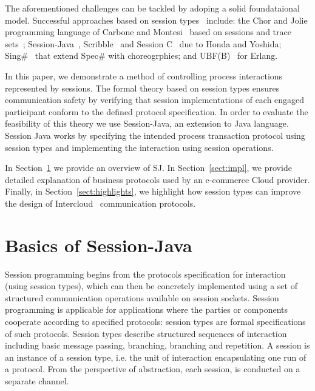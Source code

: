 \documentclass{llncs}
\begin{document}
The aforementioned challenges can be tackled by adoping a solid foundataional model. Successful approaches based on session types~\cite{session-types-sessions,carbone2007structured} include: the Chor and Jolie programming language of Carbone and Montesi~\cite{chor-lang,carbone2013deadlock} based on sessions and trace sets~\cite{chor-essence}; Session-Java~\cite{sj-lang}, Scribble~\cite{honda2011scribbling} and Session C~\cite{ng2012multiparty} due to Honda and Yoshida; Sing\#~\cite{basu2012deciding} that extend Spec\# with choreogrphies; and UBF(B)~\cite{armstrong2002getting} for Erlang.

In this paper, we demonstrate a method of controlling process interactions represented by sessions. The formal theory based on session types ensures communication safety by verifying that session implementations of each engaged participant conform to the defined protocol specification. In order to evaluate the feasibility of this theory we use Session-Java, an extension to Java language. Session Java works by specifying the intended process transaction protocol using session types and implementing the interaction using session operations.



In Section~\ref{sect:basics} we provide an overview of SJ.
In Section~\ref{sect:impl}, we provide detailed explanation of business protocols used by an e-commerce Cloud provider.
Finally, in Section~\ref{sect:highlights}, we highlight how session types can improve the design of Intercloud~\cite{intercloud} communication protocols.


\section{Basics of Session-Java}
\label{sect:basics}

Session programming begins from the protocols specification for interaction (using session types), which can then be concretely implemented using a set of structured communication operations available on session sockets. Session programming is applicable for applications where the parties or components cooperate according to specified protocols: session types are formal specifications of such protocols. Session types describe structured sequences of interaction including basic message passing, branching, branching and repetition. A session is an instance of a session type, i.e. the unit of interaction encapsulating one run of a protocol. From the perspective of abstraction, each session, is conducted on a separate channel. 
\end{document}
